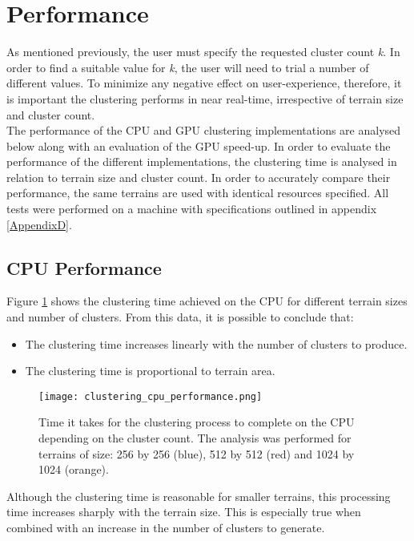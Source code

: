 \section{Performance}

As mentioned previously, the user must specify the requested cluster count \textit{k}. In order to find a suitable value for \textit{k}, the user will need to trial a number of different values. To minimize any negative effect on user-experience, therefore, it is important the clustering performs in near real-time, irrespective of terrain size and cluster count.\\

The performance of the CPU and GPU clustering implementations are analysed below along with an evaluation of the GPU speed-up. In order to evaluate the performance of the different implementations, the clustering time is analysed in relation to terrain size and cluster count. In order to accurately compare their performance, the same terrains are used with identical resources specified. All tests were performed on a machine with specifications outlined in appendix \ref{AppendixD}.

\subsection{CPU Performance}

Figure \ref{fig:cpu_clustering_performance} shows the clustering time achieved on the CPU for different terrain sizes and number of clusters. From this data, it is possible to conclude that:
\begin{itemize}
\item The clustering time increases linearly with the number of clusters to produce.
\item The clustering time is proportional to terrain area.
\end{itemize}

\begin{figure}
\center
	\texttt{[image: clustering\_cpu\_performance.png]}
	\caption{ Time it takes for the clustering process to complete on the CPU depending on the cluster count. The analysis was performed for terrains of size: 256 by 256 (blue), 512 by 512 (red) and 1024 by 1024 (orange).}	
	\label{fig:cpu_clustering_performance}
\end{figure}

Although the clustering time is reasonable for smaller terrains, this processing time increases sharply with the terrain size. This is especially true when combined with an increase in the number of clusters to generate. 

